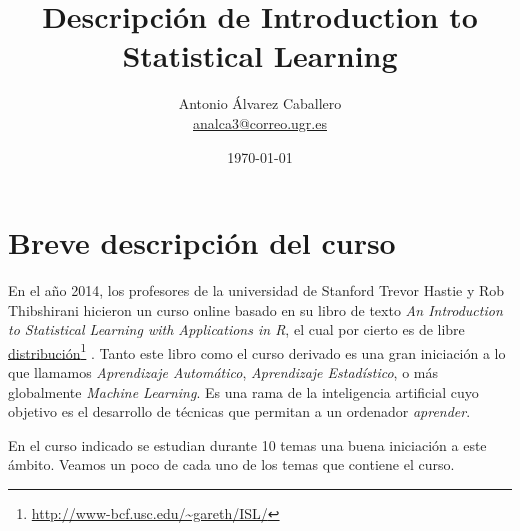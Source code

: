 \documentclass[a4paper, 11pt]{article}
\title{Descripción de Introduction to Statistical Learning}
\author{Antonio Álvarez Caballero\\
    \href{mailto:analca3@correo.ugr.es}{analca3@correo.ugr.es}}
\date{\today}
\newcommand\fnurl[2]{%
  \href{#2}{#1}\footnote{\url{#2}}%
}
\theoremstyle{definition}
\begin{document}
  \maketitle
  \tableofcontents
  \newpage

  \section{Breve descripción del curso}

  En el año 2014, los profesores de la universidad de Stanford Trevor Hastie y Rob Thibshirani hicieron un curso online basado en su libro de texto \emph{An Introduction to Statistical Learning with Applications in R}, el cual por cierto es de libre \fnurl{distribución}{http://www-bcf.usc.edu/~gareth/ISL/}. Tanto este libro como el curso derivado es una gran iniciación a lo que llamamos \emph{Aprendizaje Automático}, \emph{Aprendizaje Estadístico}, o más globalmente \emph{Machine Learning}. Es una rama de la inteligencia artificial cuyo objetivo es el desarrollo de técnicas que permitan a un ordenador \emph{aprender}.

  En el curso indicado se estudian durante 10 temas una buena iniciación a este ámbito. Veamos un poco de cada uno de los temas que contiene el curso.
\end{document}
